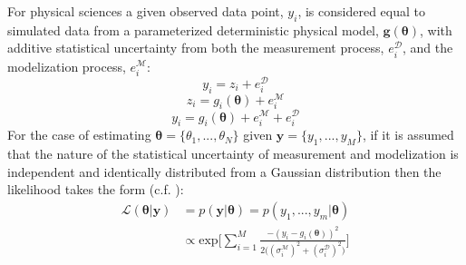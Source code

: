 For physical sciences a given observed data point, $y_i$, is considered equal to simulated data from a parameterized deterministic physical model, $\bm{g}(\bm{\theta})$, with additive statistical uncertainty from both the measurement process, $e^{\mathcal{D}}_i$, and the modelization process, $e^{\mathcal{M}}_i$:
\begin{equation}
y_i = z_i + e^{\mathcal{D}}_i
\end{equation}
\begin{equation}
z_i = g_i(\bm{\theta}) + e^{\mathcal{M}}_i
\end{equation}
\begin{equation}
y_i = g_i(\bm{\theta}) + e^{\mathcal{M}}_i + e^{\mathcal{D}}_i
\end{equation}
For the case of estimating $\bm{\theta} = \{\theta_1,...,\theta_N\}$ given $\bm{y} = \{y_1,...,y_M\}$, if it is assumed that the nature of the statistical uncertainty of measurement and modelization is independent and identically distributed from a Gaussian distribution then the likelihood takes the form (c.f. \citet[p.91-92]{gregory2005bayesian}): 
\begin{equation}
\begin{split}
\mathcal{L}(\bm{\theta}|\bm{y}) &= p(\bm{y}|\bm{\theta}) = p(y_1,...,y_m|\bm{\theta})\\
&\propto  \text{exp}\bigg[\sum_{i = 1}^{M}\frac{-(y_i-g_i({\bm{\theta}}))^2}{2\big((\sigma^{\mathcal{M}}_i)^2+(\sigma^{\mathcal{D}}_i)^2\big)}\bigg]
\end{split}
\label{likelihood-1}
\end{equation}

